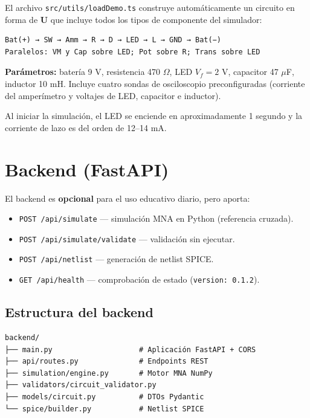 \documentclass[12pt,a4paper]{article}
\begin{document}
El archivo \texttt{src/utils/loadDemo.ts} construye automáticamente un circuito en forma de \textbf{U} que incluye todos los tipos de componente del simulador:

\begin{verbatim}
Bat(+) → SW → Amm → R → D → LED → L → GND → Bat(−)
Paralelos: VM y Cap sobre LED; Pot sobre R; Trans sobre LED
\end{verbatim}

\textbf{Parámetros:} batería 9 V, resistencia 470 $\Omega$, LED $V_f = 2$ V, capacitor 47 $\mu$F, inductor 10 mH. Incluye cuatro sondas de osciloscopio preconfiguradas (corriente del amperímetro y voltajes de LED, capacitor e inductor).

Al iniciar la simulación, el LED se enciende en aproximadamente 1 segundo y la corriente de lazo es del orden de 12--14 mA.

\section{Backend (FastAPI)}

El backend es \textbf{opcional} para el uso educativo diario, pero aporta:

\begin{itemize}
  \item \texttt{POST /api/simulate} --- simulación MNA en Python (referencia cruzada).
  \item \texttt{POST /api/simulate/validate} --- validación sin ejecutar.
  \item \texttt{POST /api/netlist} --- generación de netlist SPICE.
  \item \texttt{GET /api/health} --- comprobación de estado (\texttt{version: 0.1.2}).
\end{itemize}

\subsection{Estructura del backend}

\begin{verbatim}
backend/
├── main.py                    # Aplicación FastAPI + CORS
├── api/routes.py              # Endpoints REST
├── simulation/engine.py       # Motor MNA NumPy
├── validators/circuit_validator.py
├── models/circuit.py          # DTOs Pydantic
└── spice/builder.py           # Netlist SPICE
\end{verbatim}
\end{document}

